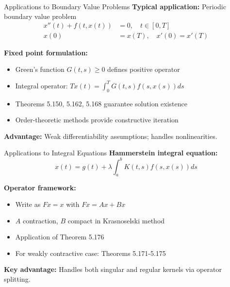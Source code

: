 \documentclass[aspectratio=169,10pt]{beamer}
\theoremstyle{plain}
\begin{document}
\begin{frame}{Applications to Boundary Value Problems}
  \textbf{Typical application:} Periodic boundary value problem
  \begin{align}
    x''(t) + f(t, x(t)) &= 0, \quad t \in [0, T] \\
    x(0) &= x(T), \quad x'(0) = x'(T)
  \end{align}

  \vspace{1em}

  \textbf{Fixed point formulation:}
  \begin{itemize}
    \item Green's function $G(t,s) \geq 0$ defines positive operator
    \item Integral operator: $Tx(t) = \int_0^T G(t,s) f(s, x(s)) ds$
    \item Theorems 5.150, 5.162, 5.168 guarantee solution existence
    \item Order-theoretic methods provide constructive iteration
  \end{itemize}

  \vspace{1em}

  \textbf{Advantage:} Weak differentiability assumptions; handles nonlinearities.
\end{frame}

\begin{frame}{Applications to Integral Equations}
  \textbf{Hammerstein integral equation:}
  $$x(t) = g(t) + \lambda \int_a^b K(t,s) f(s, x(s)) ds$$

  \vspace{1em}

  \textbf{Operator framework:}
  \begin{itemize}
    \item Write as $Fx = x$ with $Fx = Ax + Bx$
    \item $A$ contraction, $B$ compact in Krasnoselski method
    \item Application of Theorem 5.176
    \item For weakly contractive case: Theorems 5.171-5.175
  \end{itemize}

  \vspace{1em}

  \textbf{Key advantage:} Handles both singular and regular kernels via operator splitting.
\end{frame}
\end{document}
